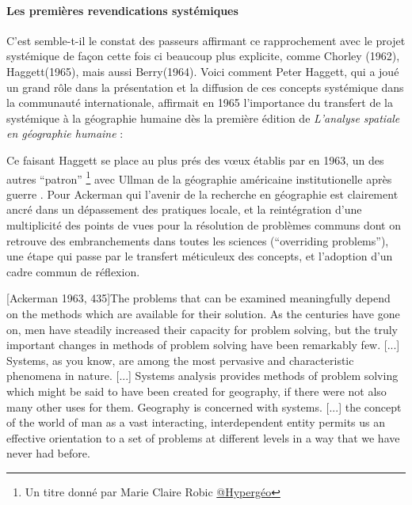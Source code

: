 
\paragraph{Les premières revendications systémiques}

C'est semble-t-il le constat des passeurs affirmant ce rapprochement avec le projet systémique de façon cette fois ci beaucoup plus explicite, comme Chorley (1962), Haggett(1965), mais aussi Berry(1964). Voici comment Peter Haggett, qui a joué un grand rôle dans la présentation et la diffusion de ces concepts systémique dans la communauté internationale, affirmait en 1965 l'importance du transfert de la systémique à la géographie humaine dès la première édition de \textit{L’analyse spatiale en géographie humaine} : 

Ce faisant Haggett se place au plus prés des vœux établis par \textcite{Ackerman1963} en 1963, un des autres \enquote{patron} \footnote{Un titre donné par Marie Claire Robic \href{http://www.hypergeo.eu/spip.php?article469}{@Hypergéo}} avec Ullman de la géographie américaine institutionelle après guerre . Pour Ackerman qui l'avenir de la recherche en géographie est clairement ancré dans un dépassement des pratiques locale, et la reintégration d'une multiplicité des points de vues pour la résolution de problèmes communs dont on retrouve des embranchements dans toutes les sciences (\foreignquote{english}{overriding problems}), une étape qui passe par le transfert méticuleux des concepts, et l'adoption d'un cadre commun de réflexion.

[Ackerman 1963, 435]{The problems that can be examined meaningfully depend on the methods which are available for their solution. As the centuries have gone on, men have steadily increased their capacity for problem solving, but the truly important changes in methods of problem solving have been remarkably few. [...] Systems, as you know, are among the most pervasive and characteristic phenomena in nature. [...] Systems analysis provides methods of problem solving which might be said to have been created for geography, if there were not also many other uses for them. Geography is concerned with systems. [...] the concept of the world of man as a vast interacting, interdependent entity permits us an effective orientation to a set of problems at different levels in a way that we have never had before.}

